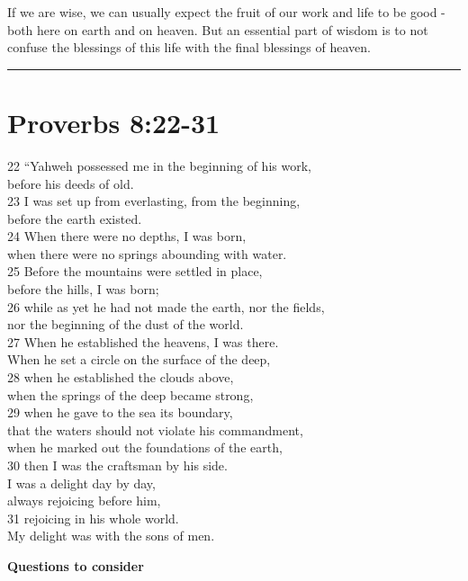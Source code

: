 \documentclass[
]{book}
\begin{document}
If we are wise, we can usually expect the fruit of our work and life to be good - both here on earth and on heaven. But an essential part of wisdom is to not confuse the blessings of this life with the final blessings of heaven.

\begin{center}\rule{0.5\linewidth}{0.5pt}\end{center}

\hypertarget{proverbs-822-31}{%
\section{Proverbs 8:22-31}\label{proverbs-822-31}}

22 ``Yahweh possessed me in the beginning of his work,\\
before his deeds of old.\\
23 I was set up from everlasting, from the beginning,\\
before the earth existed.\\
24 When there were no depths, I was born,\\
when there were no springs abounding with water.\\
25 Before the mountains were settled in place,\\
before the hills, I was born;\\
26 while as yet he had not made the earth, nor the fields,\\
nor the beginning of the dust of the world.\\
27 When he established the heavens, I was there.\\
When he set a circle on the surface of the deep,\\
28 when he established the clouds above,\\
when the springs of the deep became strong,\\
29 when he gave to the sea its boundary,\\
that the waters should not violate his commandment,\\
when he marked out the foundations of the earth,\\
30 then I was the craftsman by his side.\\
I was a delight day by day,\\
always rejoicing before him,\\
31 rejoicing in his whole world.\\
My delight was with the sons of men.

\textbf{Questions to consider}
\end{document}
